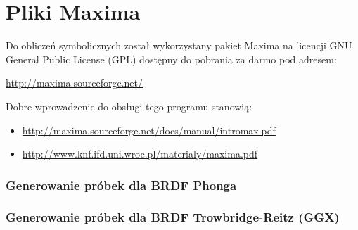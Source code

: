 \documentclass[../main.tex]{subfiles}
\begin{document}
\chapter{Pliki Maxima}
\label{appendix:maxima}

Do obliczeń symbolicznych został wykorzystany pakiet Maxima na licencji GNU
General Public License (GPL) dostępny do pobrania za darmo pod adresem:

\url{http://maxima.sourceforge.net/}

Dobre wprowadzenie do obsługi tego programu stanowią:
\begin{itemize}
\item \url{http://maxima.sourceforge.net/docs/manual/intromax.pdf}
\item \url{http://www.knf.ifd.uni.wroc.pl/materialy/maxima.pdf}
\end{itemize}

\subsection*{Generowanie próbek dla BRDF Phonga}


\subsection*{Generowanie próbek dla BRDF Trowbridge-Reitz (GGX)}

\end{document}
